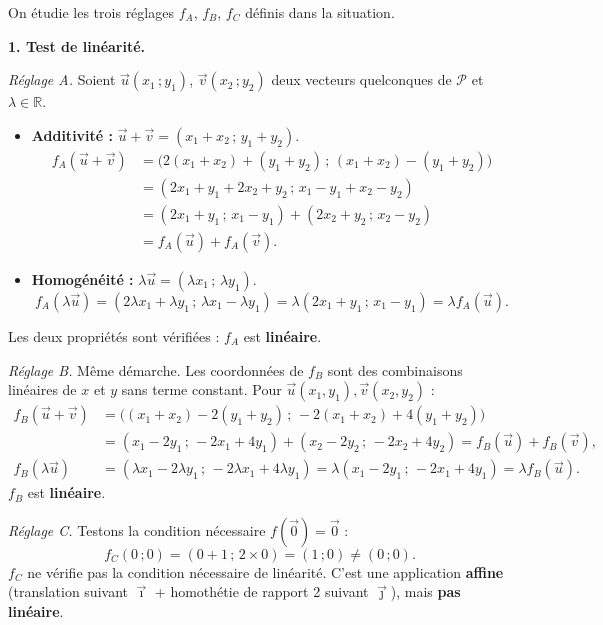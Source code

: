 \documentclass[11pt]{article}
\begin{document}
\begin{exoresolu}
On étudie les trois réglages $f_A$, $f_B$, $f_C$ définis dans la situation.

\tcblower

\textbf{1. Test de linéarité.}

\emph{Réglage A.} Soient $\vec{u}(x_1\,;y_1)$, $\vec{v}(x_2\,;y_2)$ deux vecteurs quelconques de $\mathcal{P}$ et $\lambda \in \mathbb{R}$.
\begin{itemize}
\item \textbf{Additivité :} $\vec{u}+\vec{v} = (x_1+x_2\,;\,y_1+y_2)$.
\begin{align*}
f_A(\vec{u}+\vec{v}) &= \bigl(2(x_1+x_2) + (y_1+y_2)\,;\,(x_1+x_2) - (y_1+y_2)\bigr) \\
&= (2x_1+y_1 + 2x_2+y_2\,;\,x_1-y_1 + x_2-y_2) \\
&= (2x_1+y_1\,;\,x_1-y_1) + (2x_2+y_2\,;\,x_2-y_2) \\
&= f_A(\vec{u}) + f_A(\vec{v}).
\end{align*}
\item \textbf{Homogénéité :} $\lambda\vec{u} = (\lambda x_1\,;\,\lambda y_1)$.
\[ f_A(\lambda\vec{u}) = (2\lambda x_1 + \lambda y_1\,;\,\lambda x_1 - \lambda y_1) = \lambda(2x_1+y_1\,;\,x_1-y_1) = \lambda f_A(\vec{u}). \]
\end{itemize}
Les deux propriétés sont vérifiées : $f_A$ est \textbf{linéaire}.

\emph{Réglage B.} Même démarche. Les coordonnées de $f_B$ sont des combinaisons linéaires de $x$ et $y$ sans terme constant. Pour $\vec{u}(x_1,y_1), \vec{v}(x_2,y_2)$ :
\begin{align*}
f_B(\vec{u}+\vec{v}) &= \bigl((x_1+x_2)-2(y_1+y_2)\,;\,-2(x_1+x_2)+4(y_1+y_2)\bigr) \\
&= (x_1-2y_1\,;\,-2x_1+4y_1) + (x_2-2y_2\,;\,-2x_2+4y_2) = f_B(\vec{u})+f_B(\vec{v}), \\
f_B(\lambda\vec{u}) &= (\lambda x_1 - 2\lambda y_1\,;\,-2\lambda x_1 + 4\lambda y_1) = \lambda(x_1-2y_1\,;\,-2x_1+4y_1) = \lambda f_B(\vec{u}).
\end{align*}
$f_B$ est \textbf{linéaire}.

\emph{Réglage C.} Testons la condition nécessaire $f(\vec{0}) = \vec{0}$ :
\[ f_C(0\,;0) = (0+1\,;\,2\times 0) = (1\,;0) \neq (0\,;0). \]
$f_C$ ne vérifie pas la condition nécessaire de linéarité. C'est une application \textbf{affine} (translation suivant $\vec{\imath}$ + homothétie de rapport 2 suivant $\vec{\jmath}$), mais \textbf{pas linéaire}.


\end{exoresolu}
\end{document}
